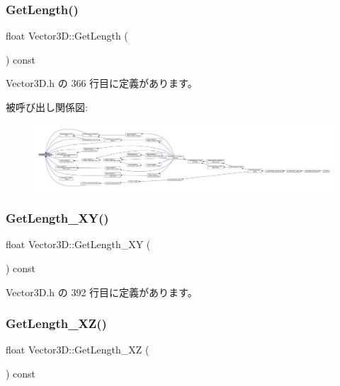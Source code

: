 \subsubsection{\texorpdfstring{Get\+Length()}{GetLength()}}
{\footnotesize\ttfamily float Vector3\+D\+::\+Get\+Length (\begin{DoxyParamCaption}{ }\end{DoxyParamCaption}) const\hspace{0.3cm}{\ttfamily [inline]}}



 Vector3\+D.\+h の 366 行目に定義があります。

被呼び出し関係図\+:
\nopagebreak
\begin{figure}[H]
\begin{center}
\leavevmode
\includegraphics[width=350pt]{class_vector3_d_a8b10872079076291bbbc81b7d48aa514_icgraph}
\end{center}
\end{figure}
\mbox{\label{class_vector3_d_abaf2a0ccb78fdf2c3a393959e9c29708}} 
\subsubsection{\texorpdfstring{Get\+Length\+\_\+\+X\+Y()}{GetLength\_XY()}}
{\footnotesize\ttfamily float Vector3\+D\+::\+Get\+Length\+\_\+\+XY (\begin{DoxyParamCaption}{ }\end{DoxyParamCaption}) const\hspace{0.3cm}{\ttfamily [inline]}}



 Vector3\+D.\+h の 392 行目に定義があります。

\mbox{\label{class_vector3_d_ae61982f6eb062257652f624ab1801089}} 
\subsubsection{\texorpdfstring{Get\+Length\+\_\+\+X\+Z()}{GetLength\_XZ()}}
{\footnotesize\ttfamily float Vector3\+D\+::\+Get\+Length\+\_\+\+XZ (\begin{DoxyParamCaption}{ }\end{DoxyParamCaption}) const\hspace{0.3cm}{\ttfamily [inline]}}



